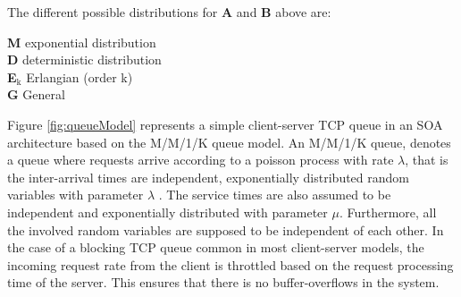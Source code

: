 \noindent The different possible distributions for \textbf{A} and \textbf{B} above are:

\begin{framed}
	\noindent \textbf{M} exponential distribution\\
	\textbf{D} deterministic distribution\\
	\textbf{E$_{\text{k}}$} Erlangian (order k)\\
	\textbf{G} General
\end{framed}



Figure \ref{fig:queueModel} represents a simple client-server TCP queue in an SOA architecture based on the M/M/1/K queue model.
An M/M/1/K queue, denotes a queue where requests arrive according to a poisson process with rate $\lambda$, that is the inter-arrival times are independent, exponentially distributed random variables with parameter $\lambda$ .
The service times are also assumed to be independent and exponentially distributed with parameter $\mu$. 
Furthermore, all the involved random variables are supposed to be independent of each other.
In the case of a blocking TCP queue common in most client-server models, the incoming request rate from the client is throttled based on the request processing time of the server. 
This ensures that there is no buffer-overflows in the system.

